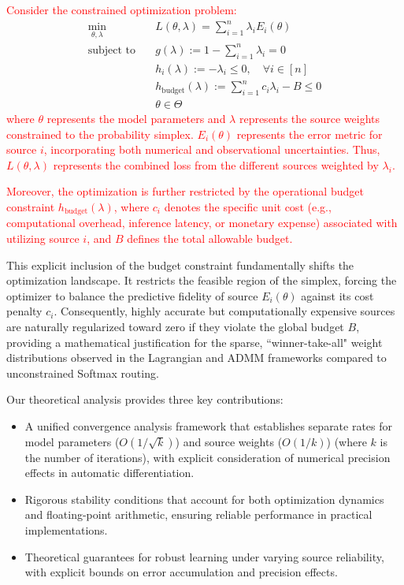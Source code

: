 \documentclass[preprint,12pt,authoryear]{elsarticle}
\begin{document}
\textcolor{red}{Consider the constrained optimization problem:}
\begin{equation}
\label{equation:constrained_optimization_setup}
\begin{aligned}
    \min_{\theta, \lambda} \quad & L(\theta, \lambda) = \sum_{i=1}^n \lambda_i E_i(\theta) \\
    \text{subject to} \quad & g(\lambda) := 1 - \sum_{i=1}^n \lambda_i = 0 \\
    & h_i(\lambda) := -\lambda_i \leq 0, \quad \forall i \in [n] \\
    & h_{\text{budget}}(\lambda) := \sum_{i=1}^n c_i \lambda_i - B \leq 0 \\
    & \theta \in \Theta
\end{aligned}
\end{equation}
\textcolor{red}{where $\theta$ represents the model parameters and $\lambda$ represents the source weights constrained to the probability simplex. $E_i(\theta)$ represents the error metric for source $i$, incorporating both numerical and observational uncertainties. Thus, $L(\theta, \lambda)$ represents the combined loss from the different sources weighted by $\lambda_i$. }

\textcolor{red}{Moreover, the optimization is further restricted by the operational budget constraint $h_{\text{budget}}(\lambda)$, where $c_i$ denotes the specific unit cost (e.g., computational overhead, inference latency, or monetary expense) associated with utilizing source $i$, and $B$ defines the total allowable budget.}

This explicit inclusion of the budget constraint fundamentally shifts the optimization landscape. It restricts the feasible region of the simplex, forcing the optimizer to balance the predictive fidelity of source $E_i(\theta)$ against its cost penalty $c_i$. Consequently, highly accurate but computationally expensive sources are naturally regularized toward zero if they violate the global budget $B$, providing a mathematical justification for the sparse, ``winner-take-all" weight distributions observed in the Lagrangian and ADMM frameworks compared to unconstrained Softmax routing.
 

Our theoretical analysis provides three key contributions:

\begin{itemize}
    \item A unified convergence analysis framework that establishes separate rates for model parameters ($O(1/\sqrt{k})$) and source weights ($O(1/k)$) (where $k$ is the number of iterations), with explicit consideration of numerical precision effects in automatic differentiation.
    \item Rigorous stability conditions that account for both optimization dynamics and floating-point arithmetic, ensuring reliable performance in practical implementations.
    \item Theoretical guarantees for robust learning under varying source reliability, with explicit bounds on error accumulation and precision effects.
\end{itemize}
\end{document}
